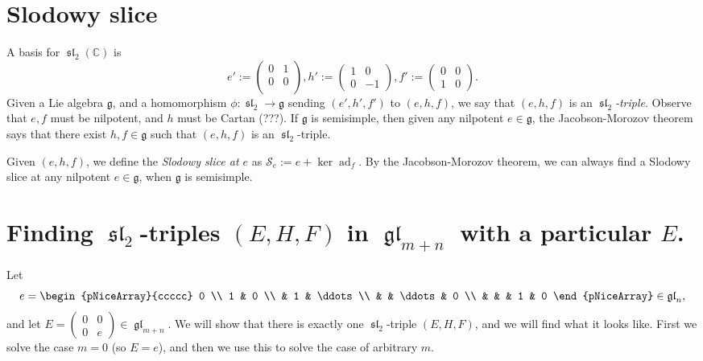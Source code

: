 \documentclass[12pt,psamsfonts]{article}
\DeclareMathOperator{\gl}{\mathfrak{gl}}
\DeclareMathOperator{\spl}{\mathfrak{sl}}
\DeclareMathOperator{\ad}{ad}
\begin{document}
\section{Slodowy slice}
A basis for \(\spl_2(\mathbb{C})\) is
\[e' := \begin{pmatrix}0 & 1 \\ 0 & 0 \\\end{pmatrix}, h' := \begin{pmatrix}1 & 0 \\0 & -1\end{pmatrix}, f' := \begin{pmatrix}0 & 0 \\1 & 0\end{pmatrix}.\]
Given a Lie algebra \(\mathfrak{g}\), and a homomorphism \(\phi : \spl_2 \to \mathfrak{g}\) sending \((e', h', f')\) to \((e, h, f)\), we say that \((e, h, f)\) is an \emph{\(\spl_2\)-triple}.
Observe that \(e, f\) must be nilpotent, and \(h\) must be Cartan (???).
If \(\mathfrak{g}\) is semisimple, then given any nilpotent \(e \in \mathfrak{g}\), the Jacobson-Morozov theorem \cite[3.7.1]{ehf} says that there exist \(h, f \in \mathfrak{g}\) such that \((e, h, f)\) is an \(\spl_2\)-triple.
\par Given \((e, h, f)\), we define the \emph{Slodowy slice at \(e\)} as \(\mathcal{S}_e := e + \ker \ad_f\).
By the Jacobson-Morozov theorem, we can always find a Slodowy slice at any nilpotent \(e \in \mathfrak{g}\), when \(\mathfrak{g}\) is semisimple.

\section{Finding \(\spl_2\)-triples \((E, H, F)\) in \(\gl_{m + n}\) with a particular \(E\).}
\par Let
\[e = \begin{pNiceArray}{ccccc}
 0 \\
    1 & 0 \\
  & 1 & \ddots \\
   & & \ddots & 0 \\
   &   &  & 1 & 0
   \end{pNiceArray} \in \mathfrak{gl}_{n},\]
and let \(E = \begin{pmatrix}0 & 0 \\ 0 & e\end{pmatrix} \in \gl_{m + n}\).
We will show that there is exactly one \(\spl_2\)-triple \((E, H, F)\), and we will find what it looks like.
First we solve the case \(m = 0\) (so \(E = e\)), and then we use this to solve the case of arbitrary \(m\).
\end{document}
